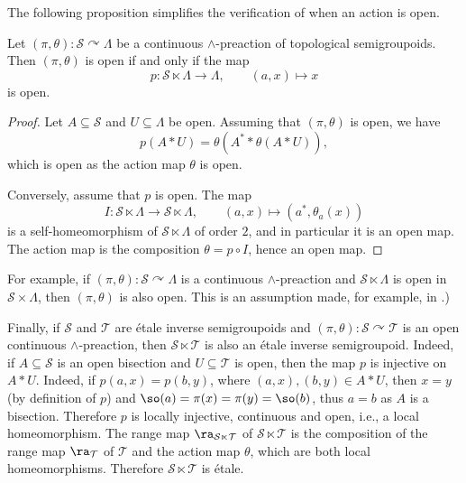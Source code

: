 The following proposition simplifies the verification of when an action is open.

\begin{proposition}\label{prop:preactionisopeniffprojectionisopen}
Let $(\pi,\theta)\colon\mathcal{S}\curvearrowright\Lambda$ be a continuous $\land$-preaction of topological semigroupoids. Then $(\pi,\theta)$ is open if and only if the map
\[p\colon\mathcal{S}\ltimes\Lambda\to\Lambda,\qquad(a,x)\mapsto x\]
is open.
\end{proposition}
\begin{proof}
Let $A\subseteq\mathcal{S}$ and $U\subseteq\Lambda$ be open. Assuming that $(\pi,\theta)$ is open, we have
\[p(A\ast U)=\theta(A^*\ast\theta(A\ast U)),\]
which is open as the action map $\theta$ is open.

Conversely, assume that $p$ is open. The map \[I\colon\mathcal{S}\ltimes\Lambda\to\mathcal{S}\ltimes\Lambda,\qquad (a,x)\mapsto (a^*,\theta_a(x))\]
is a self-homeomorphism of $\mathcal{S}\ltimes\Lambda$ of order $2$, and in particular it is an open map. The action map is the composition $\theta=p\circ I$, hence an open map.
\end{proof}

For example, if $(\pi,\theta)\colon\mathcal{S}\curvearrowright\Lambda$ is a continuous $\land$-preaction and $\mathcal{S}\ltimes\Lambda$ is open in $\mathcal{S}\times\Lambda$, then $(\pi,\theta)$ is also open. This is an assumption made, for example, in \cite{MR2045419}.)

Finally, if $\mathcal{S}$ and $\mathcal{T}$ are étale inverse semigroupoids and $(\pi,\theta)\colon\mathcal{S}\curvearrowright\mathcal{T}$ is an open continuous $\land$-preaction, then $\mathcal{S}\ltimes\mathcal{T}$ is also an étale inverse semigroupoid. Indeed, if $A\subseteq\mathcal{S}$ is an open bisection and $U\subseteq\mathcal{T}$ is open, then the map $p$ is injective on $A\ast U$. Indeed, if $p(a,x)=p(b,y)$, where $(a,x),(b,y)\in A\ast U$, then $x=y$ (by definition of $p$) and $\so(a)=\pi(x)=\pi(y)=\so(b)$, thus $a=b$ as $A$ is a bisection. Therefore $p$ is locally injective, continuous and open, i.e., a local homeomorphism. The range map $\ra_{\mathcal{S}\ltimes\mathcal{T}}$ of $\mathcal{S}\ltimes\mathcal{T}$ is the composition of the range map $\ra_{\mathcal{T}}$ of $\mathcal{T}$ and the action map $\theta$, which are both local homeomorphisms. Therefore $\mathcal{S}\ltimes\mathcal{T}$ is étale.

